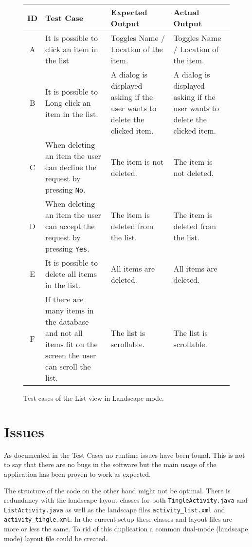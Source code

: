 \begin{figure}[H]
	\centering
	\renewcommand*{\arraystretch}{1.5} %
	\begin{tabular}{| c | p{3.5cm} | p{3.5cm} | p{3.5cm} |}
		\hline
		{\textbf{ID} } & {\textbf{Test Case} } & {\textbf{Expected Output}} & {\textbf {Actual Output}} \\\hline\hline
		A &	It is possible to click an item in the list & Toggles Name / Location of the item.  & Toggles Name / Location of the item. \\ \hline
		B & It is possible to Long click an item in the list. & A dialog is displayed asking if the user wants to delete the clicked item. & A dialog is displayed asking if the user wants to delete the clicked item. \\ \hline
		C & When deleting an item the user can decline the request by pressing \texttt{No}. & The item is not deleted. & The item is not deleted. \\ \hline
		D & When deleting an item the user can accept the request by pressing \texttt{Yes}. & The item is deleted from the list. & The item is deleted from the list. \\ \hline
		E & It is possible to delete all items in the list. & All items are deleted. & All items are deleted. \\ \hline
		F & If there are many items in the database and not all items fit on the screen the user can scroll the list. & The list is scrollable. & The list is scrollable. \\ \hline
	\end{tabular}
	
	\caption{Test cases of the List view in Landscape mode.}
	\label{tab:test-cases-list-landscape}
\end{figure}

\section{Issues}

As documented in the Test Cases no runtime issues have been found. This is not to say that there are no bugs in the software but the main usage of the application has been proven to work as expected.

The structure of the code on the other hand might not be optimal. There is redundancy with the landscape layout classes for both \texttt{TingleActivity.java} and \texttt{ListActivity.java} as well as the landscape files \texttt{activity\_list.xml} and \texttt{activity\_tingle.xml}. In the current setup these classes and layout files are more or less the same. To rid of this duplication a common dual-mode (landscape mode) layout file could be created.